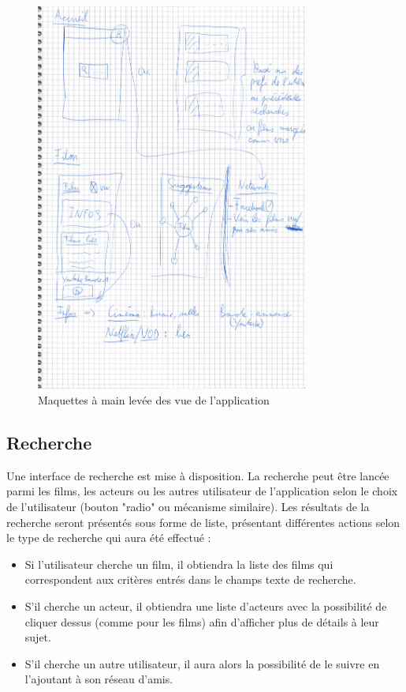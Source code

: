\begin{figure}
    \begin{center}
        \includegraphics[width=0.8\textwidth]{img/maquettes.jpg}
    \end{center}
    \caption{Maquettes à main levée des vue de l'application}
    \label{maquettes}
\end{figure}

\subsection{Recherche}
Une interface de recherche est mise à disposition. La recherche peut être lancée parmi les films, les acteurs ou les autres utilisateur de l'application selon le choix de l'utilisateur (bouton "radio" ou mécanisme similaire).
Les résultats de la recherche seront présentés sous forme de liste, présentant différentes actions selon le type de recherche qui aura été effectué :
\begin{itemize}
    \item Si l'utilisateur cherche un film, il obtiendra la liste des films qui correspondent aux critères entrés dans le champs texte de recherche.
    \item S'il cherche un acteur, il obtiendra une liste d'acteurs avec la possibilité de cliquer dessus (comme pour les films) afin d'afficher plus de détails à leur sujet.
    \item S'il cherche un autre utilisateur, il aura alors la possibilité de le suivre en l'ajoutant à son réseau d'amis.
\end{itemize}

